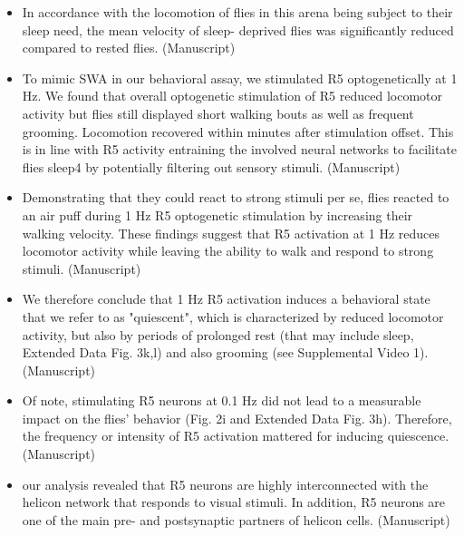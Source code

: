 \documentclass[11pt]{article}
\begin{document}
\begin{itemize}
    \item In accordance with the
    locomotion of flies in this arena being subject to their sleep need, the mean velocity of sleep-
    deprived flies was significantly reduced compared to rested flies.
    \parencite{raccugliaCoherentMultilevelNetwork2022} (Manuscript)

    \item To mimic SWA in our behavioral assay, we stimulated R5 optogenetically at 1 Hz.
    We found that overall optogenetic stimulation of R5 reduced locomotor activity
    but flies still displayed short walking bouts as well as frequent
    grooming. Locomotion recovered within minutes after stimulation offset.
    This is in line with R5 activity entraining the involved neural networks to facilitate flies sleep4
    by potentially filtering out sensory stimuli.
    \parencite{raccugliaCoherentMultilevelNetwork2022} (Manuscript)

    \item Demonstrating that they could react to strong stimuli per se, flies
    reacted to an air puff during 1 Hz R5 optogenetic stimulation by increasing their walking velocity.
    These findings suggest that R5 activation at 1 Hz reduces locomotor activity
    while leaving the ability to walk and respond to strong stimuli. 
    \parencite{raccugliaCoherentMultilevelNetwork2022} (Manuscript)

    \item We therefore conclude that 1
    Hz R5 activation induces a behavioral state that we refer to as "quiescent", which is
    characterized by reduced locomotor activity, but also by periods of prolonged rest (that may
    include sleep, Extended Data Fig. 3k,l) and also grooming (see Supplemental Video 1).
    \parencite{raccugliaCoherentMultilevelNetwork2022} (Manuscript)

    \item Of note, stimulating R5 neurons at 0.1 Hz did not lead to a
    measurable impact on the flies’ behavior (Fig. 2i and Extended Data Fig. 3h). Therefore, the
    frequency or intensity of R5 activation mattered for inducing quiescence.
    \parencite{raccugliaCoherentMultilevelNetwork2022} (Manuscript)

    \item our analysis revealed that R5 neurons are highly interconnected with the helicon network that
    responds to visual stimuli. In addition, R5 neurons are one of the main pre- and
    postsynaptic partners of helicon cells.
    \parencite{raccugliaCoherentMultilevelNetwork2022} (Manuscript)


\end{itemize}
\end{document}
